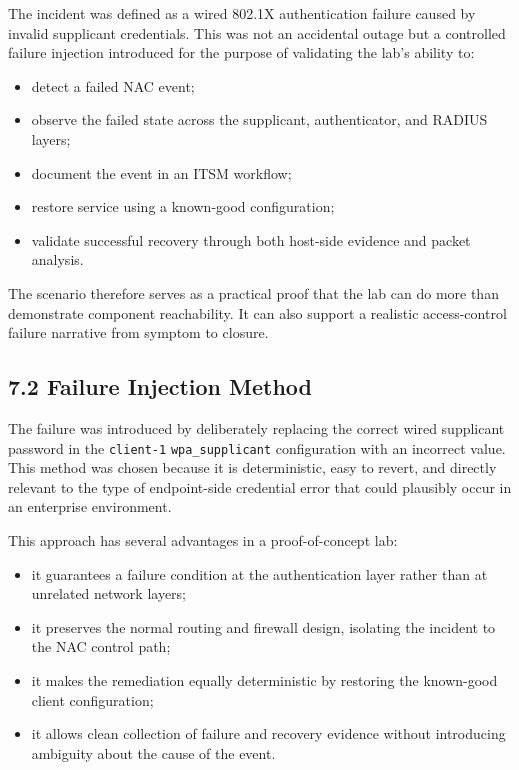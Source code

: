 \documentclass[11pt]{article}
\begin{document}
The incident was defined as a wired 802.1X authentication failure caused by invalid supplicant credentials. This was not an accidental outage but a controlled failure injection introduced for the purpose of validating the lab's ability to:

\begin{itemize}
    \item detect a failed NAC event;
    \item observe the failed state across the supplicant, authenticator, and RADIUS layers;
    \item document the event in an ITSM workflow;
    \item restore service using a known-good configuration;
    \item validate successful recovery through both host-side evidence and packet analysis.
\end{itemize}

The scenario therefore serves as a practical proof that the lab can do more than demonstrate component reachability. It can also support a realistic access-control failure narrative from symptom to closure.


\subsection{7.2 Failure Injection Method}
\label{sec:failure-injection-method}

The failure was introduced by deliberately replacing the correct wired supplicant password in the \texttt{client-1} \texttt{wpa\_supplicant} configuration with an incorrect value. This method was chosen because it is deterministic, easy to revert, and directly relevant to the type of endpoint-side credential error that could plausibly occur in an enterprise environment.

This approach has several advantages in a proof-of-concept lab:

\begin{itemize}
    \item it guarantees a failure condition at the authentication layer rather than at unrelated network layers;
    \item it preserves the normal routing and firewall design, isolating the incident to the NAC control path;
    \item it makes the remediation equally deterministic by restoring the known-good client configuration;
    \item it allows clean collection of failure and recovery evidence without introducing ambiguity about the cause of the event.
\end{itemize}
\end{document}
